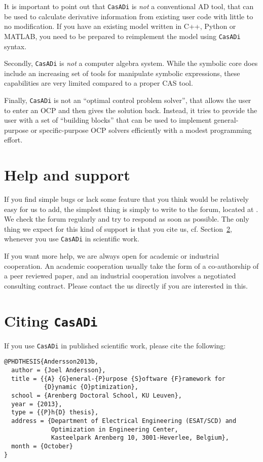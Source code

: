 \documentclass[a4paper,12pt]{book}
\newcommand{\CasADi}{\texttt{CasADi}\xspace}
\begin{document}
It is important to point out that \CasADi is \emph{not} a conventional AD tool, that can be used to calculate derivative information from existing user code with little to no modification. If you have an existing model written in C++, Python or MATLAB, you need to be prepared to reimplement the model using \CasADi syntax.

Secondly, \CasADi is \emph{not} a computer algebra system. While the symbolic core does include an increasing set of tools for manipulate symbolic expressions, these capabilities are very limited compared to a proper CAS tool.

Finally, \CasADi is not an ``optimal control problem solver'', that allows the user to enter an OCP and then gives the solution back. Instead, it tries to provide the user with a set of ``building blocks'' that can be used to implement general-purpose or specific-purpose OCP solvers efficiently with a modest programming effort.

\section{Help and support} \label{sec:support}
If you find simple bugs or lack some feature that you think would be relatively easy for us to add, the simplest thing is simply to write to the forum, located at . We check the forum regularly and try to respond as soon as possible. The only thing we expect for this kind of support is that you cite us, cf. Section~\ref{sec:citing}, whenever you use \CasADi in scientific work.

If you want more help, we are always open for academic or industrial cooperation. An academic cooperation usually take the form of a co-authorship of a peer reviewed paper, and an industrial cooperation involves a negotiated consulting contract. Please contact the us directly if you are interested in this.

\section{Citing \CasADi} \label{sec:citing}
If you use \CasADi in published scientific work, please cite the following:
\begin{verbatim}
@PHDTHESIS{Andersson2013b,
  author = {Joel Andersson},
  title = {{A} {G}eneral-{P}urpose {S}oftware {F}ramework for
           {D}ynamic {O}ptimization},
  school = {Arenberg Doctoral School, KU Leuven},
  year = {2013},
  type = {{P}h{D} thesis},
  address = {Department of Electrical Engineering (ESAT/SCD) and
             Optimization in Engineering Center,
             Kasteelpark Arenberg 10, 3001-Heverlee, Belgium},
  month = {October}
}
\end{verbatim}
\end{document}
